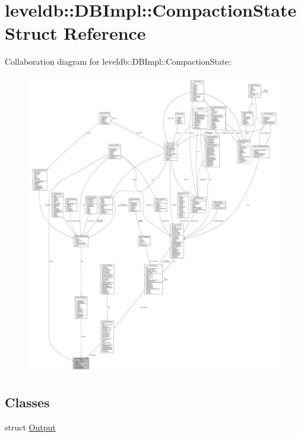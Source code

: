 \hypertarget{structleveldb_1_1_d_b_impl_1_1_compaction_state}{}\section{leveldb\+:\+:D\+B\+Impl\+:\+:Compaction\+State Struct Reference}
\label{structleveldb_1_1_d_b_impl_1_1_compaction_state}


Collaboration diagram for leveldb\+:\+:D\+B\+Impl\+:\+:Compaction\+State\+:
\nopagebreak
\begin{figure}[H]
\begin{center}
\leavevmode
\includegraphics[width=350pt]{structleveldb_1_1_d_b_impl_1_1_compaction_state__coll__graph}
\end{center}
\end{figure}
\subsection*{Classes}
\begin{DoxyCompactItemize}
\item 
struct \hyperlink{structleveldb_1_1_d_b_impl_1_1_compaction_state_1_1_output}{Output}
\end{DoxyCompactItemize}
